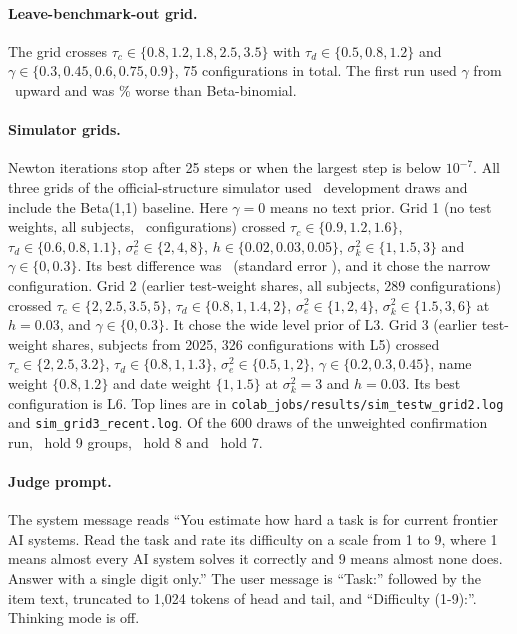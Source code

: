 \documentclass{article}
\newcommand{\BB}{Beta-binomial}
\begin{document}
\paragraph{Leave-benchmark-out grid.} The grid crosses $\tau_c\in\{0.8,1.2,1.8,2.5,3.5\}$ with $\tau_d\in\{0.5,0.8,1.2\}$ and $\gamma\in\{0.3,0.45,0.6,0.75,0.9\}$, 75 configurations in total. The first run used $\gamma$ from \LoboInitGammaMin\ upward and was \LoboInitRelAbs\% worse than \BB.
\paragraph{Simulator grids.} Newton iterations stop after 25 steps or when the largest step is below $10^{-7}$. All three grids of the official-structure simulator used \GridDraws\ development draws and include the Beta(1,1) baseline. Here $\gamma=0$ means no text prior.
Grid 1 (no test weights, all subjects, \GridN\ configurations) crossed $\tau_c\in\{0.9,1.2,1.6\}$, $\tau_d\in\{0.6,0.8,1.1\}$, $\sigma_e^2\in\{2,4,8\}$, $h\in\{0.02,0.03,0.05\}$, $\sigma_k^2\in\{1,1.5,3\}$ and $\gamma\in\{0,0.3\}$. Its best difference was \GridDiff\ (standard error \GridSe), and it chose the narrow configuration.
Grid 2 (earlier test-weight shares, all subjects, 289 configurations) crossed $\tau_c\in\{2,2.5,3.5,5\}$, $\tau_d\in\{0.8,1,1.4,2\}$, $\sigma_e^2\in\{1,2,4\}$, $\sigma_k^2\in\{1.5,3,6\}$ at $h=0.03$, and $\gamma\in\{0,0.3\}$. It chose the wide level prior of L3.
Grid 3 (earlier test-weight shares, subjects from 2025, 326 configurations with L5) crossed $\tau_c\in\{2,2.5,3.2\}$, $\tau_d\in\{0.8,1,1.3\}$, $\sigma_e^2\in\{0.5,1,2\}$, $\gamma\in\{0.2,0.3,0.45\}$, name weight $\{0.8,1.2\}$ and date weight $\{1,1.5\}$ at $\sigma_k^2=3$ and $h=0.03$. Its best configuration is L6.
Top lines are in \texttt{colab\_jobs/results/sim\_testw\_grid2.log} and \texttt{sim\_grid3\_recent.log}.
Of the 600 draws of the unweighted confirmation run, \ConfNine\ hold 9 groups, \ConfEight\ hold 8 and \ConfSeven\ hold 7.
\paragraph{Judge prompt.} The system message reads ``You estimate how hard a task is for current frontier AI systems. Read the task and rate its difficulty on a scale from 1 to 9, where 1 means almost every AI system solves it correctly and 9 means almost none does. Answer with a single digit only.'' The user message is ``Task:'' followed by the item text, truncated to 1,024 tokens of head and tail, and ``Difficulty (1-9):''. Thinking mode is off.
\end{document}
